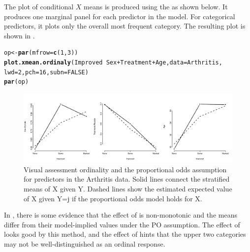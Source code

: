 \documentclass[11pt]{book}\usepackage[]{graphicx}\usepackage[]{color}
\makeatletter
\newcommand{\hlnum}[1]{\textcolor[rgb]{0.686,0.059,0.569}{#1}}%
\newcommand{\hlopt}[1]{\textcolor[rgb]{0,0,0}{#1}}%
\newcommand{\hlstd}[1]{\textcolor[rgb]{0.345,0.345,0.345}{#1}}%
\newcommand{\hlkwb}[1]{\textcolor[rgb]{0.69,0.353,0.396}{#1}}%
\newcommand{\hlkwc}[1]{\textcolor[rgb]{0.333,0.667,0.333}{#1}}%
\newcommand{\hlkwd}[1]{\textcolor[rgb]{0.737,0.353,0.396}{\textbf{#1}}}%
\newenvironment{kframe}{%
 \def\at@end@of@kframe{}%
 \ifinner\ifhmode%
  \def\at@end@of@kframe{\end{minipage}}%
  \begin{minipage}{\columnwidth}%
 \fi\fi%
 \def\FrameCommand##1{\hskip\@totalleftmargin \hskip-\fboxsep
 \colorbox{shadecolor}{##1}\hskip-\fboxsep
     \hskip-\linewidth \hskip-\@totalleftmargin \hskip\columnwidth}%
 \MakeFramed {\advance\hsize-\width
   \@totalleftmargin\z@ \linewidth\hsize
   \@setminipage}}%
 {\par\unskip\endMakeFramed%
 \at@end@of@kframe}
\newenvironment{knitrout}{}{} %
\renewenvironment{knitrout}{\small\renewcommand{\baselinestretch}{.85}}{} %
\makeatother
\begin{document}
The plot of conditional $X$ means is produced using the  as shown
below.  It produces one marginal panel for each predictor in the model.  
For categorical predictors, it plots only the overall most frequent category.
The resulting plot is shown in .
\begin{knitrout}
\color{fgcolor}\begin{kframe}
\begin{alltt}
\hlstd{op} \hlkwb{<-} \hlkwd{par}\hlstd{(}\hlkwc{mfrow}\hlstd{=}\hlkwd{c}\hlstd{(}\hlnum{1}\hlstd{,}\hlnum{3}\hlstd{))}
\hlkwd{plot.xmean.ordinaly}\hlstd{(Improved} \hlopt{~} \hlstd{Sex} \hlopt{+} \hlstd{Treatment} \hlopt{+} \hlstd{Age,} \hlkwc{data}\hlstd{=Arthritis,}
                    \hlkwc{lwd}\hlstd{=}\hlnum{2}\hlstd{,} \hlkwc{pch}\hlstd{=}\hlnum{16}\hlstd{,} \hlkwc{subn}\hlstd{=}\hlnum{FALSE}\hlstd{)}
\hlkwd{par}\hlstd{(op)}
\end{alltt}
\end{kframe}\begin{figure}[!htbp]


\centerline{\includegraphics[width=\textwidth]{ch07/fig/arth-rmsplot-1} }

\caption[Visual assessment ordinality and the proportional odds assumption for predictors in the Arthritis data]{Visual assessment ordinality and the proportional odds assumption for predictors in the Arthritis data. Solid lines connect the stratified means of X given Y. Dashed lines show the estimated expected value of X given Y=j if the proportional odds model holds for X.\label{fig:arth-rmsplot}}
\end{figure}


\end{knitrout}
In , there is some evidence that the effect of  is
non-monotonic and the means differ from their model-implied values under the 
PO assumption.  The effect of  looks good by this method, and
the effect of  hints that the upper two categories may not be 
well-distinguished as an ordinal response.
\end{document}
